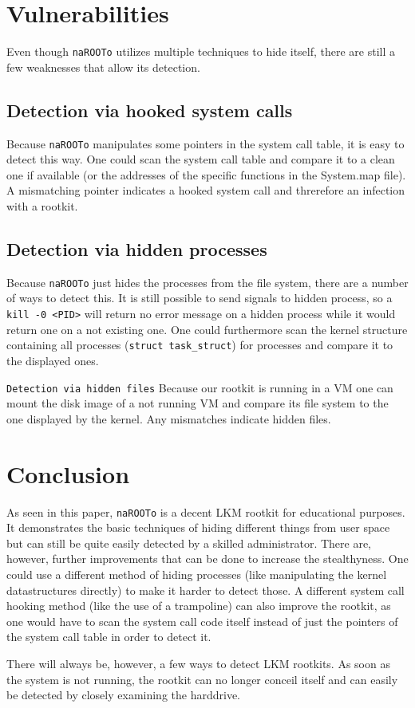 \documentclass[10pt, letterpaper]{scrartcl}
\begin{document}
\section{Vulnerabilities}
Even though \texttt{naROOTo} utilizes multiple techniques to hide itself, there are still a few weaknesses that allow its detection.

\subsection{Detection via hooked system calls}
Because \texttt{naROOTo} manipulates some pointers in the system call table, it is easy to detect this way.
One could scan the system call table and compare it to a clean one if available (or the addresses of the specific functions in the System.map file).
A mismatching pointer indicates a hooked system call and threrefore an infection with a rootkit.

\subsection{Detection via hidden processes}
Because \texttt{naROOTo} just hides the processes from the file system, there are a number of ways to detect this.
It is still possible to send signals to hidden process, so a \texttt{kill -0 <PID>} will return no error message on a hidden process while it would return one on a not existing one.
One could furthermore scan the kernel structure containing all processes (\texttt{struct task\_struct}) for processes and compare it to the displayed ones.

\texttt{Detection via hidden files}
Because our rootkit is running in a VM one can mount the disk image of a not running VM and compare its file system to the one displayed by the kernel. 
Any mismatches indicate hidden files.


\section{Conclusion}
As seen in this paper, \texttt{naROOTo} is a decent LKM rootkit for educational purposes.
It demonstrates the basic techniques of hiding different things from user space but can still be quite easily detected by a skilled administrator.
There are, however, further improvements that can be done to increase the stealthyness.
One could use a different method of hiding processes (like manipulating the kernel datastructures directly) to make it harder to detect those.
A different system call hooking method (like the use of a trampoline) can also improve the rootkit, as one would have to scan the system call code itself instead of just the pointers of the system call table in order to detect it.

There will always be, however, a few ways to detect LKM rootkits. As soon as the system is not running, the rootkit can no longer conceil itself and can easily be detected by closely examining the harddrive.
\end{document}
